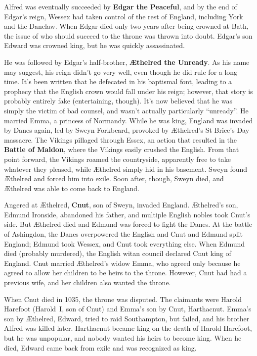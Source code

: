 Alfred was eventually succeeded by \textbf{Edgar the Peaceful}, and by the end of Edgar's reign,
Wessex had taken control of the rest of England, including York and the Danelaw.
When Edgar died only two years after being crowned at Bath,
the issue of who should succeed to the throne was thrown into doubt.
Edgar's son Edward was crowned king, but he was quickly assassinated.

He was followed by Edgar's half-brother, \textbf{\AE{}thelred the Unready}.
As his name may suggest, his reign didn't go very well, even though he did rule for a long time.
It's been written that he defecated in his baptismal font,
leading to a prophecy that the English crown would fall under his reign;
however, that story is probably entirely fake (entertaining, though).
It's now believed that he was simply the victim of bad counsel, and wasn't actually particularly ``unready''.
He married Emma, a princess of Normandy.
While he was king, England was invaded by Danes again, led by Sweyn Forkbeard,
provoked by \AE{}thelred's St Brice's Day massacre.
The Vikings pillaged through Essex, an action that resulted in the \textbf{Battle of Maldon},
where the Vikings easily crushed the English.
From that point forward, the Vikings roamed the countryside, apparently free to take whatever they pleased,
while \AE{}thelred simply hid in his basement.
Sweyn found \AE{}thelred and forced him into exile.
Soon after, though, Sweyn died, and \AE{}thelred was able to come back to England.

Angered at \AE{}thelred, \textbf{Cnut}, son of Sweyn, invaded England.
\AE{}thelred's son, Edmund Ironside, abandoned his father, and multiple English nobles took Cnut's side.
But \AE{}thelred died and Edmund was forced to fight the Danes.
At the battle of Ashingdon, the Danes overpowered the English and Cnut and Edmund split England;
Edmund took Wessex, and Cnut took everything else.
When Edmund died (probably murdered), the English witan council declared Cnut king of England.
Cnut married \AE{}thelred's widow Emma,
who agreed only because he agreed to allow her children to be heirs to the throne.
However, Cnut had had a previous wife, and her children also wanted the throne.

When Cnut died in 1035, the throne was disputed.
The claimants were Harold Harefoot (Harold~I, son of Cnut) and Emma's son by Cnut, Harthacnut.
Emma's son by \AE{}thelred, Edward, tried to raid Southampton, but failed,
and his brother Alfred was killed later.
Harthacnut became king on the death of Harold Harefoot, but he was unpopular,
and nobody wanted his heirs to become king.
When he died, Edward came back from exile and was recognized as king.

